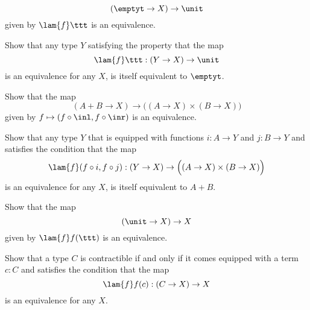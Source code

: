 \begin{exercises}
\begin{subexenum}
\begin{equation*}
(\emptyt \to X)\to \unit
\end{equation*}
given by $\lam{f}\ttt$ is an equivalence. 
\item Show that any type $Y$ satisfying the property that the map 
\begin{equation*}
\lam{f}\ttt: (Y\to X)\to \unit
\end{equation*} 
is an equivalence for any $X$, is itself equivalent to $\emptyt$.
\end{subexenum}
\item 
\begin{subexenum}
\item Show that the map
\begin{equation*}
(A+B\to X)\to \Big((A\to X)\times (B\to X)\Big)
\end{equation*}
given by $f\mapsto (f\circ\inl,f\circ\inr)$ is an equivalence.
\item Show that any type $Y$ that is equipped with functions $i:A\to Y$ and $j:B\to Y$ and satisfies the condition that the map
\begin{equation*}
\lam{f}(f\circ i,f\circ j): (Y\to X)\to \Big((A\to X)\times (B\to X)\Big)
\end{equation*}
is an equivalence for any $X$, is itself equivalent to $A+B$.
\end{subexenum}
\item 
\begin{subexenum}
\item Show that the map
\begin{equation*}
(\unit\to X)\to X
\end{equation*}
given by $\lam{f}f(\ttt)$ is an equivalence. 
\item Show that a type $C$ is contractible if and only if it comes equipped with a term $c:C$ and satisfies the condition that the map
\begin{equation*}
\lam{f}f(c) :(C\to X)\to X
\end{equation*}
is an equivalence for any $X$.
\end{subexenum}
\end{exercises}
